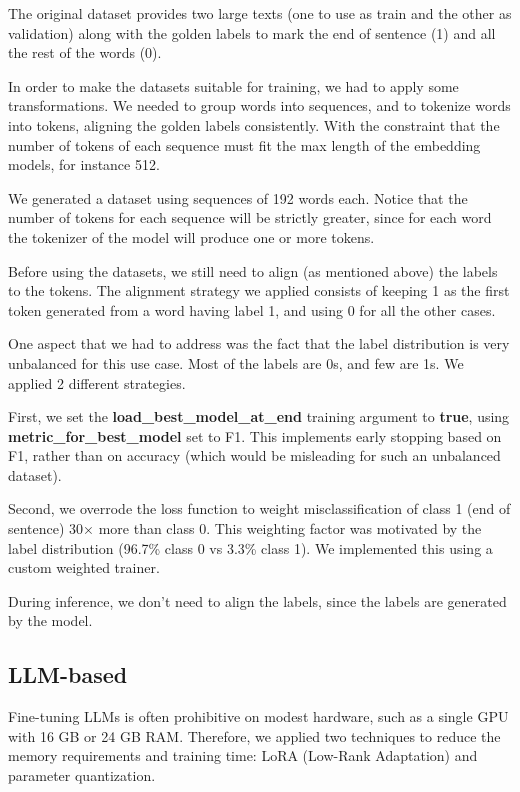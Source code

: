 \documentclass[11pt]{article}
\begin{document}
The original dataset provides two large texts (one to use as train and the other as validation) along with the golden labels to mark the end of sentence (1) and all the rest of the words (0).

In order to make the datasets suitable for training, we had to apply some transformations. 
We needed to group words into sequences, and to tokenize words into tokens, aligning the golden labels consistently.
With the constraint that the number of tokens of each sequence must fit the max length of the embedding models,
for instance 512.

We generated a dataset using sequences of 192 words each. Notice that the number of tokens for each sequence will be strictly greater,
since for each word the tokenizer of the model will produce one or more tokens.

Before using the datasets, we still need to align (as mentioned above) the labels to the tokens.
The alignment strategy we applied consists of keeping 1 as the first token generated from a word
having label 1, and using 0 for all the other cases.

One aspect that we had to address was the fact that the label distribution is very unbalanced
for this use case. Most of the labels are 0s, and few are 1s. We applied 2 different strategies.

First, we set the \textbf{load\_best\_model\_at\_end} training argument to \textbf{true},
using \textbf{metric\_for\_best\_model} set to F1. This implements early stopping based on F1,
rather than on accuracy (which would be misleading for such an unbalanced dataset).

Second, we overrode the loss function to weight misclassification of class 1 (end of sentence) 30× more than class 0.
This weighting factor was motivated by the label distribution (96.7\% class 0 vs 3.3\% class 1). 
We implemented this using a custom weighted trainer. 

During inference, we don't need to align the labels, since the labels are generated by the model.

\subsection{LLM-based}

Fine-tuning LLMs is often prohibitive on modest hardware, such as a single GPU with 16 GB or 24 GB RAM. Therefore, we applied two techniques to reduce the memory requirements and training time: LoRA (Low-Rank Adaptation) and parameter quantization.
\end{document}
